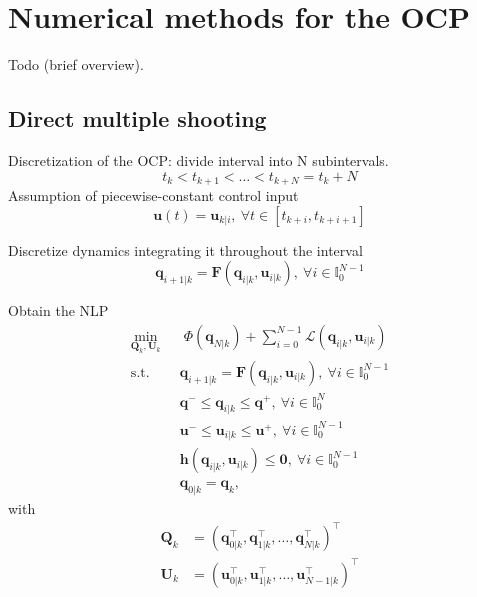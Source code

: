 \section{Numerical methods for the OCP}
Todo (brief overview).

\subsection{Direct multiple shooting}
Discretization of the OCP: divide interval into N subintervals.
\begin{equation*}
    t_k < t_{k+1} < \dots < t_{k+N} = t_k + N
\end{equation*}
Assumption of piecewise-constant control input
\begin{equation*}
    \bm{u}(t) = \bm{u}_{k|i}, \ \forall t \in [t_{k+i}, t_{k+i+1}]
\end{equation*}

Discretize dynamics integrating it throughout the interval
\begin{equation*}
    \bm{q}_{i+1|k} = \bm{F}(\bm{q}_{i|k}, \bm{u}_{i|k}), \ \forall i \in \mathbb{I}_{0}^{N-1}
\end{equation*}

Obtain the NLP
\begin{equation}
    \label{eq:transcribed-OCP}
    \begin{aligned}
        \min_{\bm{Q}_k, \bm{U}_k} \;\;
            & \; \Phi(\bm{q}_{N|k}) + \sum_{i=0}^{N-1} \mathcal{L}(\bm{q}_{i|k}, \bm{u}_{i|k}) \\
            \text{s.t. } & \bm{q}_{i+1|k} = \bm{F}(\bm{q}_{i|k}, \bm{u}_{i|k}), \ \forall i \in \mathbb{I}_{0}^{N-1} \\
                         & \bm{q}^- \le \bm{q}_{i|k} \le \bm{q}^+, \ \forall i \in \mathbb{I}_{0}^{N} \\
                         & \bm{u}^- \le \bm{u}_{i|k} \le \bm{u}^+, \ \forall i \in \mathbb{I}_{0}^{N-1} \\
                         & \bm{h}(\bm{q}_{i|k}, \bm{u}_{i|k}) \le \bm{0}, \ \forall i \in \mathbb{I}_{0}^{N-1} \\
                         & \bm{q}_{0|k} = \bm{q}_k,
    \end{aligned}
\end{equation}
with
\begin{align*}
\bm{Q}_k &= (\bm{q}_{0|k}^\top, \bm{q}_{1|k}^\top, \dots, \bm{q}_{N|k}^\top)^\top \\
\bm{U}_k &= (\bm{u}_{0|k}^\top, \bm{u}_{1|k}^\top, \dots, \bm{u}_{N-1|k}^\top)^\top
\end{align*}

